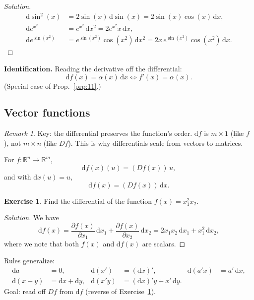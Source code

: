 \documentclass[14pt]{extarticle}
\theoremstyle{plain}
\theoremstyle{definition}
\newtheorem{exercise}{Exercise}
\theoremstyle{remark}
\newtheorem{remark}{Remark}
\newenvironment{solution}{%
  \begin{proof}[Solution]%
}{%
  \end{proof}%
}
\newcommand{\dd}{\mathrm{d}}
\begin{document}
\begin{solution}
\begin{align*}
\dd\sin^2(x) &= 2\sin(x)\, \dd\sin(x) = 2\sin(x)\cos(x)\, \dd x, \\
\dd e^{x^2} &= e^{x^2}\, \dd x^2 = 2e^{x^2} x\, \dd x, \\
\dd e^{\sin(x^2)} &= e^{\sin(x^2)} \cos(x^2)\, \dd x^2 = 2x\, e^{\sin(x^2)} \cos(x^2)\, \dd x.
\end{align*}
\end{solution}

\textbf{Identification.} Reading the derivative off the differential:
\begin{equation}\label{eq:14}
\dd f(x) = \alpha(x)\, \dd x \iff f'(x) = \alpha(x).
\end{equation}
(Special case of Prop.~\ref{prp:11}.)

\subsection{Vector functions}\label{sec:4.3}

\begin{remark}\label{rem:diff_dim}
Key: the differential preserves the function's order. $\dd f$ is $m \times 1$ (like $f$), not $m \times n$ (like $Df$). This is why differentials scale from vectors to matrices.
\end{remark}

For $f : \mathbb{R}^n \to \mathbb{R}^m$,
\begin{equation}\label{eq:15}
\dd f(x)(u) = (Df(x))\, u,
\end{equation}
and with $\dd x(u) = u$,
\begin{equation}\label{eq:16}
\dd f(x) = (Df(x))\, \dd x.
\end{equation}

\begin{exercise}\label{exer:9}
Find the differential of the function $f(x) = x_1^2 x_2$.
\end{exercise}

\begin{solution}
We have
\[
\dd f(x) = \frac{\partial f(x)}{\partial x_1}\, \dd x_1 + \frac{\partial f(x)}{\partial x_2}\, \dd x_2
= 2x_1 x_2\, \dd x_1 + x_1^2\, \dd x_2,
\]
where we note that both $f(x)$ and $\dd f(x)$ are scalars.
\end{solution}

Rules generalize:
\begin{equation}\label{eq:17}
\begin{aligned}
\dd a &= 0, & \dd(x') &= (\dd x)', & \dd(a'x) &= a'\, \dd x, \\
\dd(x+y) &= \dd x + \dd y, & \dd(x'y) &= (\dd x)'y + x'\, \dd y.
\end{aligned}
\end{equation}
Goal: read off $Df$ from $\dd f$ (reverse of Exercise~\ref{exer:9}).
\end{document}
